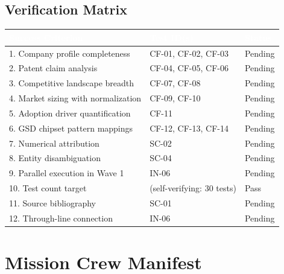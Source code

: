 \documentclass[11pt,letterpaper]{article}
\newcommand{\tableheader}[1]{\textbf{\sffamily\textcolor{white}{#1}}}
\begin{document}
\subsection{Verification Matrix}

\begin{center}
\begin{tabularx}{\textwidth}{XL{3cm}C{1.5cm}}
\toprule
{}
\tableheader{Success Criterion} & \tableheader{Test ID(s)} & \tableheader{Status} \\
. Company profile completeness & CF-01, CF-02, CF-03 & Pending \\
2. Patent claim analysis & CF-04, CF-05, CF-06 & Pending \\
3. Competitive landscape breadth & CF-07, CF-08 & Pending \\
4. Market sizing with normalization & CF-09, CF-10 & Pending \\
5. Adoption driver quantification & CF-11 & Pending \\
6. GSD chipset pattern mappings & CF-12, CF-13, CF-14 & Pending \\
7. Numerical attribution & SC-02 & Pending \\
8. Entity disambiguation & SC-04 & Pending \\
9. Parallel execution in Wave 1 & IN-06 & Pending \\
10. Test count target & (self-verifying: 30 tests) & Pass \\
11. Source bibliography & SC-01 & Pending \\
12. Through-line connection & IN-06 & Pending \\
\bottomrule
\end{tabularx}
\end{center}

\section{Mission Crew Manifest}
\end{document}
